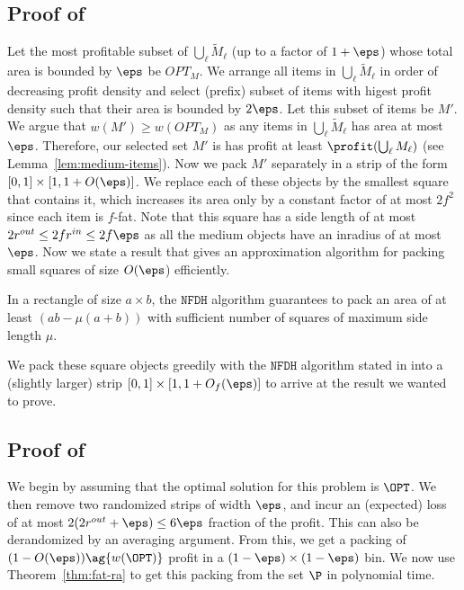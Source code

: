 \subsection{Proof of }
Let the most profitable subset of $\bigcup_{\ell} \tilde{M}_{\ell}$
(up to a factor of $1+\eps$) whose total area is bounded by $\eps$ be $OPT_{M}$.
 We arrange all items in $\bigcup_{\ell}\tilde{M}_{\ell}$ in order of decreasing profit density and select (prefix) subset of items with higest profit density such that their area is bounded by $2\eps$. Let this subset of items be $M'$. We argue that $w(M')\ge w(OPT_M)$ as any items in $\bigcup_{\ell} \tilde{M}_{\ell}$ has area at most $\eps$.
 Therefore, our selected set $M'$ is has profit at least $\profit(\bigcup_{\ell}M_{\ell})$
(see Lemma~\ref{lem:medium-items}).
Now we pack  $M'$ 
separately in a strip of the form $[0,1]\times[1,1+O(\eps)]$.
We replace each
of these objects by the smallest square that contains it, which
increases its area only by a constant factor of at most {$2f^2$ since each item is $f$-fat. Note that this square has a side length of at most $2r^{out} \le 2f r^{in} \le 2f\eps$ as all the medium objects have an inradius of at most $\eps$. Now we state a result that gives an approximation algorithm for packing small squares of size $O(\eps$) efficiently.}
\begin{lemma}\label{lem:nfdh}
	In a rectangle of size $a \times b$, the $\mathtt{NFDH}$ algorithm guarantees to pack an area of at least $(ab-\mu(a+b))$ with sufficient number of squares of maximum side length $\mu$.
\end{lemma}

We pack these square objects greedily with the $\mathtt{NFDH}$ algorithm
\cite{NFDH} stated in  into a (slightly larger) strip $[0,1]\times[1,1+O_f(\eps)]$ to arrive at the result we wanted to prove.

\subsection{Proof of }
We begin by assuming that the optimal solution for this problem is $\OPT$. We then remove two randomized strips of width $\eps$, and incur an (expected) loss of at most $2(2 r^{out}+\eps) \le 6 \eps$ fraction of the profit. 
This can also be derandomized by an averaging argument. 
From this, we get a packing of $(1-O(\eps)) \ag{w(\OPT)}$ profit in a $(1-\eps)\times (1-\eps)$ bin. We now use Theorem~\ref{thm:fat-ra} to get this packing from the set $\P$ in polynomial time. 

